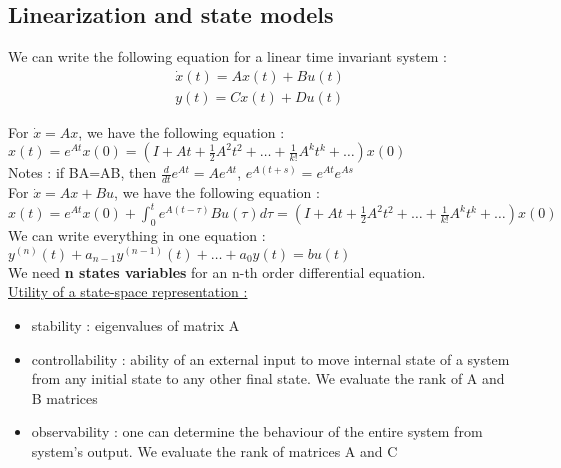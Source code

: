 \documentclass[../main.tex]{subfiles}
\begin{document}
\subsection{Linearization and state models}
We can write the following equation for a linear time invariant system :\\
\begin{equation}
    \begin{split}
        \dot{x}(t) = Ax(t) + Bu(t)\\
        y(t) = Cx(t) + Du(t)
    \end{split}
\end{equation}

For $\dot{x} = Ax$, we have the following equation :\\
$x(t) = e^{At}x(0) = (I+At+\frac{1}{2}A^2t^2+\dots + \frac{1}{k!}A^kt^k + \dots )x(0)$\\

\color{gray}Notes : if BA=AB, then $\frac{d}{dt}e^{At} = Ae^{At}$, $e^{A(t+s)} = e^{At}e^{As}$\color{black}\\

For $\dot{x} = Ax + Bu$, we have the following equation :\\
$x(t) = e^{At}x(0)+\int_0^t e^{A(t-\tau)}Bu(\tau)d\tau = (I+At+\frac{1}{2}A^2t^2+\dots + \frac{1}{k!}A^kt^k + \dots )x(0)$\\

We can write everything in one equation : $y^{(n)}(t) + a_{n-1}y^{(n-1)}(t) + \dots + a_0y(t) = bu(t)$\\

We need \textbf{n states variables} for an n-th order differential equation.\\

\quad \underline{Utility of a state-space representation :}\\
\begin{itemize}
    \item stability : eigenvalues of matrix A\\
    \item controllability : ability of an external input to move internal state of a system from any initial state to any other final state. We evaluate the rank of A and B matrices\\
    \item observability : one can determine the behaviour of the entire system from system's output. We evaluate the rank of matrices A and C\\
\end{itemize}
\end{document}
